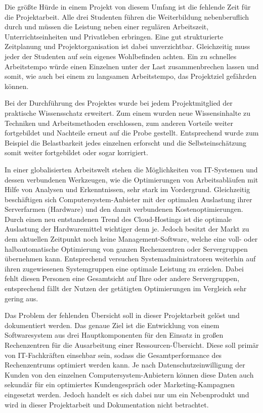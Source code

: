 Die größte Hürde in einem Projekt von diesem Umfang ist die fehlende Zeit für
die Projektarbeit. Alle drei Studenten führen die Weiterbildung nebenberuflich
durch und müssen die Leistung neben einer regulären Arbeitszeit,
Unterrichtseinheiten und Privatleben erbringen. Eine gut strukturierte
Zeitplanung und Projektorganisation ist dabei unverzichtbar. Gleichzeitig muss
jeder der Studenten auf sein eigenes Wohlbefinden achten. Ein zu schnelles
Arbeitstempo würde einen Einzelnen unter der Last zusammenbrechen lassen und
somit, wie auch bei einem zu langsamen Arbeitstempo, das Projektziel gefährden
können.

Bei der Durchführung des Projektes wurde bei jedem Projektmitglied der
praktische Wissensschatz erweitert. Zum einem wurden neue Wissensinhalte zu
Techniken und Arbeitsmethoden erschlossen, zum anderen Vorteile weiter
fortgebildet und Nachteile erneut auf die Probe gestellt. Entsprechend wurde
zum Beispiel die Belastbarkeit jedes einzelnen erforscht und die
Selbsteinschätzung somit weiter fortgebildet oder sogar korrigiert.

In einer globalisierten Arbeitswelt stehen die Möglichkeiten von IT-Systemen
und dessen verbundenen Werkzeugen, wie die Optimierungen von Arbeitsabläufen
mit Hilfe von Analysen und Erkenntnissen, sehr stark im Vordergrund.
Gleichzeitig beschäftigen sich Computersystem-Anbieter mit der optimalen
Auslastung ihrer Serverfarmen (Hardware) und den damit verbundenen
Kostenoptimierungen. Durch einen neu entstandenen Trend des Cloud-Hostings ist
die optimale Auslastung der Hardwaremittel wichtiger denn je. Jedoch besitzt
der Markt zu dem aktuellen Zeitpunkt noch keine Management-Software, welche
eine voll- oder halbautomatische Optimierung von ganzen Rechenzentren oder
Servergruppen übernehmen kann. Entsprechend versuchen Systemadministratoren
weiterhin auf ihren zugewiesenen Systemgruppen eine optimale Leistung zu
erzielen. Dabei fehlt diesen Personen eine Gesamtsicht auf Ihre oder andere
Servergruppen, entsprechend fällt der Nutzen der getätigten Optimierungen im
Vergleich sehr gering aus.

Das Problem der fehlenden Übersicht soll in dieser Projektarbeit gelöst und
dokumentiert werden. Das genaue Ziel ist die Entwicklung von einem
Softwaresystem aus drei Hauptkomponenten für den Einsatz in großen
Rechenzentren für die Ausarbeitung einer Ressourcen-Übersicht. Diese soll
primär von IT-Fachkräften einsehbar sein, sodass die Gesamtperformance des
Rechenzentrums optimiert werden kann. Je nach Datenschutzeinwilligung der
Kunden von den einzelnen Computersystem-Anbietern können diese Daten auch
sekundär für ein optimiertes Kundengespräch oder Marketing-Kampagnen eingesetzt
werden. Jedoch handelt es sich dabei nur um ein Nebenprodukt und wird in dieser
Projektarbeit und Dokumentation nicht betrachtet.

